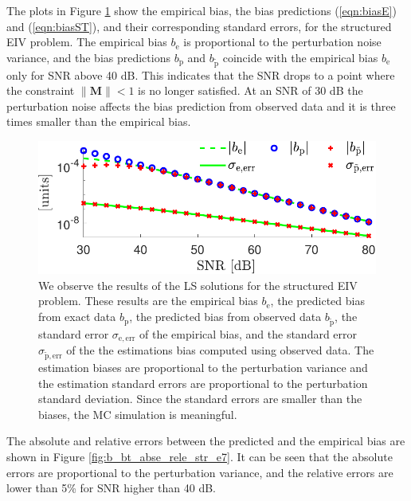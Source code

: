 The plots \color{blue} in \color{black} Figure \ref{bias_sigma_NMC_str_str_n2} show the empirical bias, the bias predictions (\ref{eqn:biasE}) and (\ref{eqn:biasST}), and their corresponding standard errors, for the structured EIV problem.
The empirical bias $b_\mathrm{e}$ is proportional to the perturbation noise variance, and
the bias predictions $b_\mathrm{p}$ and $b_{\widetilde{\mathrm{p}}}$ coincide with the empirical bias $b_\mathrm{e}$ only for SNR above 40 dB.
This indicates that the SNR drops to a point where the constraint $\| \mathbf{M} \| < 1$ is no longer satisfied.
At an SNR of 30 dB the perturbation noise affects the bias prediction from observed data and it is three times smaller than the empirical bias.

\begin{figure}[htb!]
 \centering
 \includegraphics[width=0.69\columnwidth]{./ChapterStatisticalAnalysis/fig/Fig_7.pdf} 
  \caption{ \label{bias_sigma_NMC_str_str_n2} 
  We observe the results of the LS solutions \color{blue} for the structured EIV problem\color{black}. These results are the empirical bias $b_{\mathrm{e}}$, the predicted bias from exact data $b_{\mathrm{p}}$, the predicted bias from observed data $b_{\widetilde{\mathrm{p}}}$, the standard error $\sigma_{\mathrm{e,err}}$ of the empirical bias, and the standard error $\sigma_{\widetilde{\mathrm{p}} \mathrm{,err}}$ of the the estimations bias computed using observed data. The estimation biases are proportional to the perturbation variance and the estimation standard errors are proportional to the perturbation standard deviation. Since the standard errors are smaller than the biases, the MC simulation is meaningful. }
\end{figure}

The absolute and relative errors between the predicted and the empirical bias are shown in Figure \ref{fig:b_bt_abse_rele_str_e7}.
It can be seen that the absolute errors are proportional to the perturbation variance, and the relative errors are lower than 5\% for SNR higher than 40 dB. 


